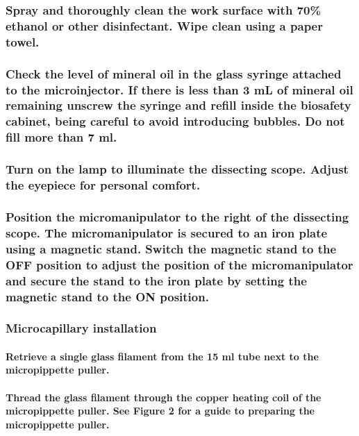 \documentclass[11pt]{article}
\begin{document}
\subsubsection{{\sffamily } Spray and thoroughly clean the work surface with 70\% ethanol or other disinfectant. Wipe clean using a paper towel.}
\label{sec:orgheadline16}
\subsubsection{{\sffamily } Check the level of mineral oil in the glass syringe attached to the microinjector. If there is less than 3 mL of mineral oil remaining unscrew the syringe and refill inside the biosafety cabinet, being careful to avoid introducing bubbles. Do not fill more than 7 ml.}
\label{sec:orgheadline17}
\subsubsection{{\sffamily } Turn on the lamp to illuminate the dissecting scope. Adjust the eyepiece for personal comfort.}
\label{sec:orgheadline18}
\subsubsection{{\sffamily } Position the micromanipulator to the right of the dissecting scope. The micromanipulator is secured to an iron plate using a magnetic stand. Switch the magnetic stand to the OFF position to adjust the position of the micromanipulator and secure the stand to the iron plate by setting the magnetic stand to the ON position.}
\label{sec:orgheadline19}
\subsubsection{{\sffamily } Microcapillary installation}
\label{sec:orgheadline40}
\paragraph{{\sffamily } Retrieve a single glass filament from the 15 ml tube next to the micropippette puller.}
\label{sec:orgheadline20}
\paragraph{{\sffamily } Thread the glass filament through the copper heating coil of the micropippette puller. See \textbf{Figure 2} for a guide to preparing the micropippette puller.}
\label{sec:orgheadline21}
\end{document}
